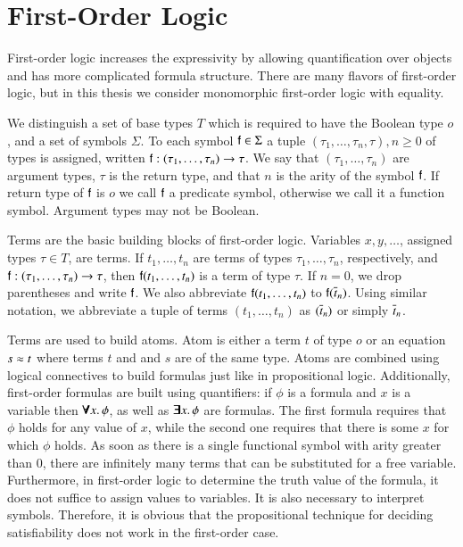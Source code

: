 \section{First-Order Logic}

First-order logic increases the expressivity by allowing quantification over
objects and has more complicated formula structure. There are many flavors of
first-order logic, but in this thesis we consider monomorphic first-order logic
with equality.

We distinguish a set of base types $T$ which is required to have the Boolean
type $o$, and a set of symbols $\Sigma$. To each symbol $\mathsf{f} \in \Sigma$ a
tuple $(\tau_1, \ldots, \tau_{n}, \tau), n \geq 0$ of types is assigned, written
$\mathsf{f} : (\tau_1, \ldots, \tau_{n}) \rightarrow \tau$. We say that $(\tau_1,
\ldots, \tau_{n})$ are argument types, $\tau$ is the return type, and that $n$
is the arity of the symbol $\mathsf{f}$. If return type of $\mathsf{f}$ is $o$ we call
$\mathsf{f}$ a predicate symbol, otherwise we call it a function symbol. Argument types may not be Boolean.

Terms are the basic building blocks of first-order logic. Variables
$x,y,\ldots$, assigned types $\tau \in T$, are terms. If $t_1,\ldots,t_n$ are
terms of types $\tau_1, \ldots, \tau_n$, respectively, and $\mathsf{f} : (\tau_1,
\ldots, \tau_{n}) \rightarrow \tau$, then $\mathsf{f}(t_1, \ldots, t_n)$ is a term
of type $\tau$. If $n=0$, we drop parentheses and write $\mathsf{f}$. We also
abbreviate $\mathsf{f}(t_1, \ldots, t_n)$ to $\mathsf{f}(\overline{t}_{n})$. Using similar
notation, we abbreviate a tuple of terms $(t_1, \ldots, t_n)$ as $(\overline{t}_{n})$
or simply $\overline{t}_{n}$.

Terms are used to build atoms. Atom is either a term $t$ of type $o$ or an
equation $s \approx t$ where terms $t$ and and $s$ are of the same type. Atoms are
combined using logical connectives to build formulas just like in propositional
logic. Additionally, first-order formulas are built using quantifiers: if $\phi$
is a formula and $x$ is a variable then $\pmb\forall x.\, \phi$, as well as
$\pmb\exists x.\, \phi$ are formulas. The first formula requires that $\phi$ holds
for any value of $x$, while the second one requires that there is some $x$ for
which $\phi$ holds. As soon as there is a single functional symbol with arity
greater than 0, there are infinitely many terms that can be substituted for a
free variable. Furthermore, in first-order logic to determine the truth value of
the formula, it does not suffice to assign values to variables. It is also
necessary to interpret symbols. Therefore, it is obvious that the propositional
technique for deciding satisfiability does not work in the first-order case.

